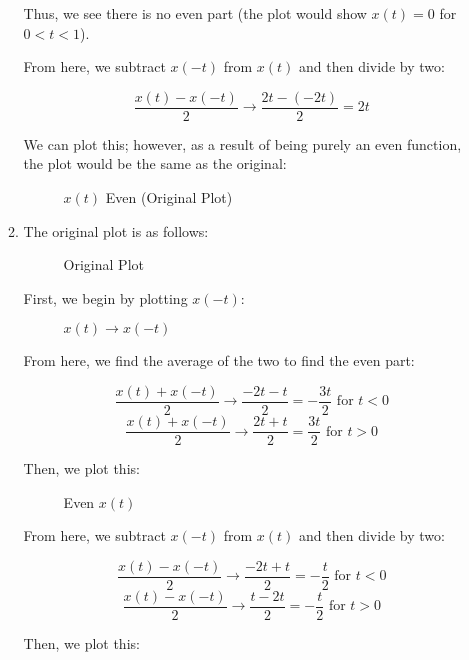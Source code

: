 \begin{enumerate}
\begin{enumerate}
        Thus, we see there is no even part (the plot would show $x(t)=0$ for $0<t<1$).

        From here, we subtract $x(-t)$ from $x(t)$ and then divide by two:

        $$\frac{x(t)-x(-t)}{2}\to\frac{2t-(-2t)}{2}=2t$$

        We can plot this; however, as a result of being purely an even function, the plot would be the same as the original:

        \begin{figure}[H]
          \centering
          
          \caption{$x(t)$ Even (Original Plot)}
          \label{fig:14}
        \end{figure}

      \item The original plot is as follows:

        \begin{figure}[H]
          \centering
          
          \caption{Original Plot}
          \label{fig:15}
        \end{figure}

        First, we begin by plotting $x(-t)$:

        \begin{figure}[H]
          \centering
          
          \caption{$x(t)\to x(-t)$}
          \label{fig:16}
        \end{figure}

        From here, we find the average of the two to find the even part:

        $$\frac{x(t)+x(-t)}{2}\to\frac{-2t-t}{2}=-\frac{3t}{2}\text{ for }t<0$$
        $$\frac{x(t)+x(-t)}{2}\to\frac{2t+t}{2}=\frac{3t}{2}\text{ for }t>0$$

        Then, we plot this:

        \begin{figure}[H]
          \centering
          
          \caption{Even $x(t)$}
          \label{fig:17}
        \end{figure}

        From here, we subtract $x(-t)$ from $x(t)$ and then divide by two:

        $$\frac{x(t)-x(-t)}{2}\to\frac{-2t+t}{2}=-\frac{t}{2}\text{ for }t<0$$
        $$\frac{x(t)-x(-t)}{2}\to\frac{t-2t}{2}=-\frac{t}{2}\text{ for }t>0$$

        Then, we plot this:


\end{enumerate}
\end{enumerate}
